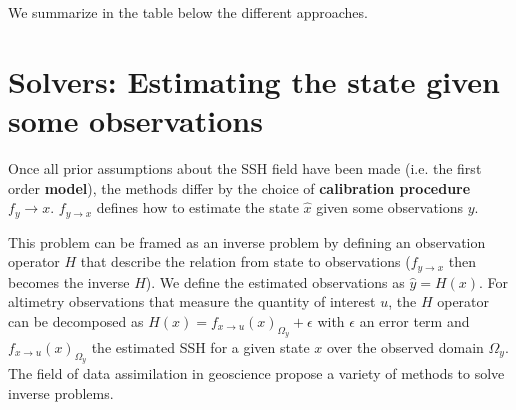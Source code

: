 \begin{bibunit}
We summarize in the table below the different approaches.
  \begin{table}
  \centering
\caption{\textbf{Comparison of SSH models across various methods}. The columns indicate the type of state representation $x$, the method of obtaining estimated SSH $\hat{u}$, and the prior distribution $p(x)$.}
\end{table}



\section{Solvers: Estimating the state given some observations}
  \label{c2sec:solvers}
Once all prior assumptions about the SSH field have been made (i.e. the first order \textbf{model}), the methods differ by the choice of \textbf{calibration procedure} $f_y{\to x}$. $f_{y\to x}$ defines how to estimate the state $\hat{x}$ given some observations $y$.

This problem can be framed as an inverse problem by defining an observation operator $H$ that describe the relation from state to observations ($f_{y\to x}$ then becomes the inverse $H$).
We define the estimated observations as $\hat{y} = H(x)$. For altimetry observations that measure the quantity of interest $u$, the $H$ operator can be decomposed as $H(x) = f_{x\to u}(x)_{\Omega_y} + \epsilon$ with $\epsilon$ an error term and $f_{x\to u}(x)_{\Omega_y}$ the estimated SSH for a given state $x$ over the observed domain $\Omega_y$. The field of data assimilation in geoscience propose a variety of methods to solve inverse problems.


\end{bibunit}
